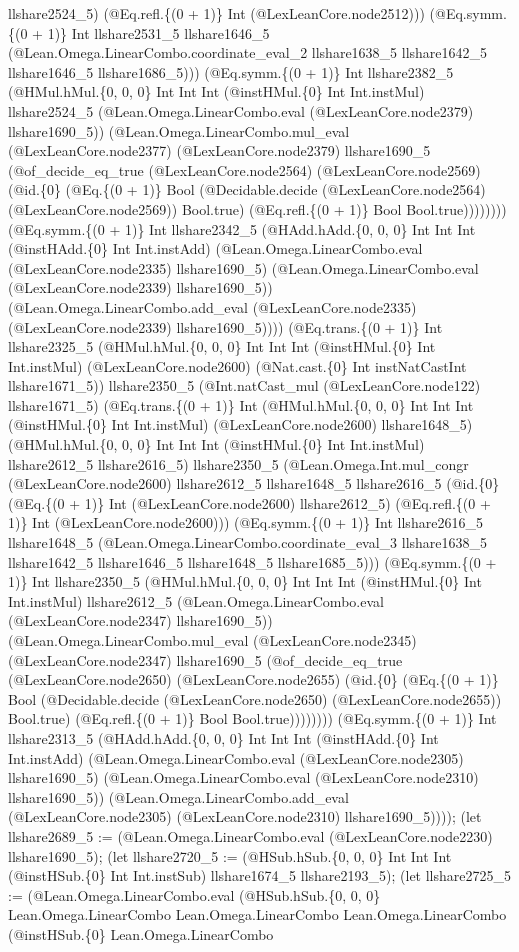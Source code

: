 \documentclass[11pt]{article}
\begin{document}
llshare2524\_5) (@Eq.refl.\{(0 + 1)\} Int (@LexLeanCore.node2512))) (@Eq.symm.\{(0 + 1)\} Int llshare2531\_5 llshare1646\_5 (@Lean.Omega.LinearCombo.coordinate\_eval\_2 llshare1638\_5 llshare1642\_5 llshare1646\_5 llshare1686\_5))) (@Eq.symm.\{(0 + 1)\} Int llshare2382\_5 (@HMul.hMul.\{0, 0, 0\} Int Int Int (@instHMul.\{0\} Int Int.instMul) llshare2524\_5 (@Lean.Omega.LinearCombo.eval (@LexLeanCore.node2379) llshare1690\_5)) (@Lean.Omega.LinearCombo.mul\_eval (@LexLeanCore.node2377) (@LexLeanCore.node2379) llshare1690\_5 (@of\_decide\_eq\_true (@LexLeanCore.node2564) (@LexLeanCore.node2569) (@id.\{0\} (@Eq.\{(0 + 1)\} Bool (@Decidable.decide (@LexLeanCore.node2564) (@LexLeanCore.node2569)) Bool.true) (@Eq.refl.\{(0 + 1)\} Bool Bool.true)))))))) (@Eq.symm.\{(0 + 1)\} Int llshare2342\_5 (@HAdd.hAdd.\{0, 0, 0\} Int Int Int (@instHAdd.\{0\} Int Int.instAdd) (@Lean.Omega.LinearCombo.eval (@LexLeanCore.node2335) llshare1690\_5) (@Lean.Omega.LinearCombo.eval (@LexLeanCore.node2339) llshare1690\_5)) (@Lean.Omega.LinearCombo.add\_eval (@LexLeanCore.node2335) (@LexLeanCore.node2339) llshare1690\_5)))) (@Eq.trans.\{(0 + 1)\} Int llshare2325\_5 (@HMul.hMul.\{0, 0, 0\} Int Int Int (@instHMul.\{0\} Int Int.instMul) (@LexLeanCore.node2600) (@Nat.cast.\{0\} Int instNatCastInt llshare1671\_5)) llshare2350\_5 (@Int.natCast\_mul (@LexLeanCore.node122) llshare1671\_5) (@Eq.trans.\{(0 + 1)\} Int (@HMul.hMul.\{0, 0, 0\} Int Int Int (@instHMul.\{0\} Int Int.instMul) (@LexLeanCore.node2600) llshare1648\_5) (@HMul.hMul.\{0, 0, 0\} Int Int Int (@instHMul.\{0\} Int Int.instMul) llshare2612\_5 llshare2616\_5) llshare2350\_5 (@Lean.Omega.Int.mul\_congr (@LexLeanCore.node2600) llshare2612\_5 llshare1648\_5 llshare2616\_5 (@id.\{0\} (@Eq.\{(0 + 1)\} Int (@LexLeanCore.node2600) llshare2612\_5) (@Eq.refl.\{(0 + 1)\} Int (@LexLeanCore.node2600))) (@Eq.symm.\{(0 + 1)\} Int llshare2616\_5 llshare1648\_5 (@Lean.Omega.LinearCombo.coordinate\_eval\_3 llshare1638\_5 llshare1642\_5 llshare1646\_5 llshare1648\_5 llshare1685\_5))) (@Eq.symm.\{(0 + 1)\} Int llshare2350\_5 (@HMul.hMul.\{0, 0, 0\} Int Int Int (@instHMul.\{0\} Int Int.instMul) llshare2612\_5 (@Lean.Omega.LinearCombo.eval (@LexLeanCore.node2347) llshare1690\_5)) (@Lean.Omega.LinearCombo.mul\_eval (@LexLeanCore.node2345) (@LexLeanCore.node2347) llshare1690\_5 (@of\_decide\_eq\_true (@LexLeanCore.node2650) (@LexLeanCore.node2655) (@id.\{0\} (@Eq.\{(0 + 1)\} Bool (@Decidable.decide (@LexLeanCore.node2650) (@LexLeanCore.node2655)) Bool.true) (@Eq.refl.\{(0 + 1)\} Bool Bool.true)))))))) (@Eq.symm.\{(0 + 1)\} Int llshare2313\_5 (@HAdd.hAdd.\{0, 0, 0\} Int Int Int (@instHAdd.\{0\} Int Int.instAdd) (@Lean.Omega.LinearCombo.eval (@LexLeanCore.node2305) llshare1690\_5) (@Lean.Omega.LinearCombo.eval (@LexLeanCore.node2310) llshare1690\_5)) (@Lean.Omega.LinearCombo.add\_eval (@LexLeanCore.node2305) (@LexLeanCore.node2310) llshare1690\_5)))); (let llshare2689\_5 := (@Lean.Omega.LinearCombo.eval (@LexLeanCore.node2230) llshare1690\_5); (let llshare2720\_5 := (@HSub.hSub.\{0, 0, 0\} Int Int Int (@instHSub.\{0\} Int Int.instSub) llshare1674\_5 llshare2193\_5); (let llshare2725\_5 := (@Lean.Omega.LinearCombo.eval (@HSub.hSub.\{0, 0, 0\} Lean.Omega.LinearCombo Lean.Omega.LinearCombo Lean.Omega.LinearCombo (@instHSub.\{0\} Lean.Omega.LinearCombo 
\end{document}
